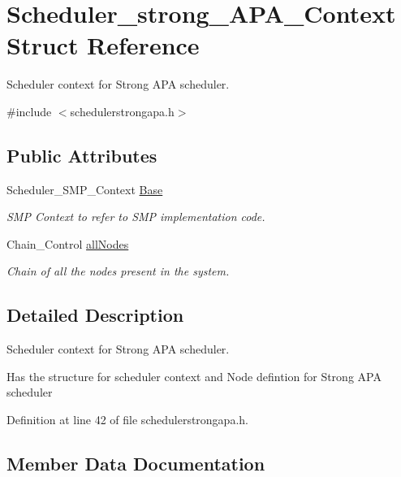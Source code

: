 \hypertarget{structScheduler__strong__APA__Context}{}\section{Scheduler\+\_\+strong\+\_\+\+A\+P\+A\+\_\+\+Context Struct Reference}
\label{structScheduler__strong__APA__Context}


Scheduler context for Strong A\+PA scheduler.  




{\ttfamily \#include $<$schedulerstrongapa.\+h$>$}

\subsection*{Public Attributes}
\begin{DoxyCompactItemize}
\item 
Scheduler\+\_\+\+S\+M\+P\+\_\+\+Context \hyperlink{structScheduler__strong__APA__Context_a55755b445b7e7beaf1b87b178521e615}{Base}
\begin{DoxyCompactList}\small\item\em S\+MP Context to refer to S\+MP implementation code. \end{DoxyCompactList}\item 
Chain\+\_\+\+Control \hyperlink{structScheduler__strong__APA__Context_ad850b98c29b7ab48bb7aff1a941fb331}{all\+Nodes}
\begin{DoxyCompactList}\small\item\em Chain of all the nodes present in the system. \end{DoxyCompactList}\end{DoxyCompactItemize}


\subsection{Detailed Description}
Scheduler context for Strong A\+PA scheduler. 

Has the structure for scheduler context and Node defintion for Strong A\+PA scheduler 

Definition at line 42 of file schedulerstrongapa.\+h.



\subsection{Member Data Documentation}
\mbox{\label{structScheduler__strong__APA__Context_ad850b98c29b7ab48bb7aff1a941fb331}} 
